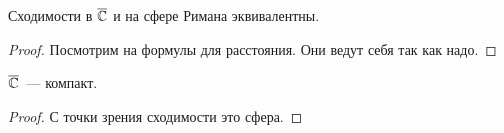 \begin{consequence}
    Сходимости в $\overline{\mathbb{C}}$ и на сфере Римана эквивалентны.
\end{consequence}

\begin{proof}
    Посмотрим на формулы для расстояния.
    Они ведут себя так как надо.
\end{proof}

\begin{consequence}
    $\overline{\mathbb{C}}$~--- компакт.
\end{consequence}

\begin{proof}
    С точки зрения сходимости это сфера.
\end{proof}

\newpage
